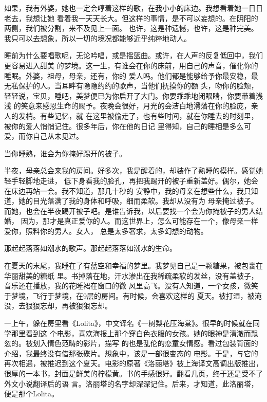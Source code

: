 		如果，我有外婆，她也一定会哼着这样的歌，在我小小的床边。我想看着她一日日老去，我想让她
	看着我一天天长大。但这样的事情，是不可以妄想的。在阴阳的两侧，我们被分割，来不及见上一面。
	也许，这是种遗憾，也许，这是种完美。我只可以去想象，所以一切的境况都能够近乎纯粹地动人。

		睡前为什么要唱歌呢，无论吟唱，或是摇篮曲。或许，在人声的反复低回中，我们更容易进入甜美
	的梦境。这一生，有谁会在你的床前，用自己的声音，催化你的睡眠。外婆，祖母，母亲，还有，你的
	爱人吗。他们都是能够给予你最安稳，最无私保护的人。当耳畔有隐隐约约的歌声，当他们抚摸你的额
	头，吻你的脸颊，轻轻说，宝贝，睡吧，美梦便已为你启开了大门。你要乖乖地闭眼睛，你要带着浅浅
	的笑意来感恩生命的赐予。夜晚会很好，月光的会洁白地滑落在你的脸庞，亲人的发梢。有些记忆，就
	在这里被偷走了，也有些时间，就在你睡去的时刻里，被你的爱人悄悄记住。很多年后，你在他的日记
	里得知，自己的睡相是多么可爱，而你自己从未见过。

		当你睡熟，谁会为你掩好踢开的被子。

		半夜，母亲总会来我的房间。好多次，我是醒着的，却装作了熟睡的模样。感觉她轻手轻脚地走进，
	低下身看我的脸孔，再把我踢开的被子重新盖好。偶尔，她会在床边再站一会。我不知道，那几十秒的
	安静中，我的母亲在想些什么，我只知道，她的目光落满了我的身体和呼吸，细而柔软。我却从没有为
	母亲掩过被子。而她，也会在半夜踢开被子吧。是谁告诉我，以后要找一个会为你掩被子的男人结婚，
	因为，那才是真正爱你的人。而这世界上，怎么可能存在一个，像母亲一样爱你，照料你的男人。女人，
	总是太多奢求，太多幻想的动物。

		那起起落落如潮水的歌声。那起起落落如潮水的生命。

		在夏天的末尾，我睡在了有蓝空和幸福的梦里。我梦见自己是一颗糖果，被包裹在华丽甜美的糖纸
	里。书掉落在地，汗水渗出在我稀疏柔软的发丝，没有盖被子，音乐还在播放，我的花睡裙在窗口的微
	风里高飞。没有人知道，一个女孩，微笑于梦境，飞行于梦境，在9层的房间。有时候，会喜欢这样的
	夏天。被打湿，被淹没，去狠狠忘却，再被狠狠忘却。

	\endwriting



		一上午，躲在房里看《Lolita》，中文译名《一树梨花压海棠》。很早的时候就在同学那里看到这
	个电影，喜欢海报上那个穿白色衣服的女孩。她的眼神是清澈而飘忽的。被划入情色范畴的影片，描写
	的也是乱伦的恋童女情感。看过包装背面的介绍，我最终没有借那张碟片。想象中，该是一部很变态的
	电影。于是，与它的再次相遇，被推迟到这个夏天。电影的原著《洛丽塔》被上海译文高调出版推出，
	很厚的一本书，封面是鲜美的柠檬黄。书的手感很好。翻看几页，终于还是受不了外文小说翻译后的语
	言。洛丽塔的名字却深深记住。后来，才知道，此洛丽塔，便是那个Lolita。

